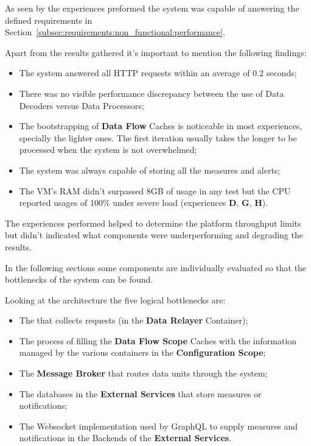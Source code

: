 As seen by the experiences preformed the system was capable of answering the defined requirements in Section~\ref{subsec:requirements:non_functional:performance}.

Apart from the results gathered it's important to mention the following findings:

\begin{itemize}
    \item The system answered all HTTP requests within an average of 0.2 seconds;
    \item There was no visible performance discrepancy between the use of Data Decoders versus Data Processors;
    \item The bootstrapping of \textbf{Data Flow} Caches is noticeable in most experiences, specially the lighter ones. The first iteration usually takes the longer to be processed when the system is not overwhelmed;
    \item The system was always capable of storing all the measures and alerts;
    \item The \gls{VM}'s RAM didn't surpassed 8GB of usage in any test but the CPU reported usages of 100\% under severe load (experiences \textbf{D}, \textbf{G}, \textbf{H}).
\end{itemize}

The experiences performed helped to determine the platform throughput limits but didn't indicated what components were underperforming and degrading the results.

In the following sections some components are individually evaluated so that the bottlenecks of the system can be found.

Looking at the architecture the five logical bottlenecks are:

\begin{itemize}
    \item The  that collects requests (in the \textbf{Data Relayer} Container);
    \item The process of filling the \textbf{Data Flow Scope} Caches with the information managed by the various containers in the \textbf{Configuration Scope};
    \item The \textbf{Message Broker} that routes data units through the system;
    \item The databases in the \textbf{External Services} that store measures or notifications;
    \item The Websocket implementation used by GraphQL to supply measures and notifications in the Backends of the \textbf{External Services}.
\end{itemize}

